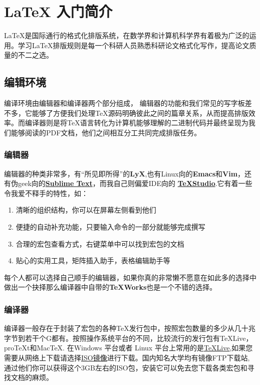 \section{LaTeX 入门简介}
\LaTeX 是国际通行的格式化排版系统，在数学界和计算机科学界有着极为广泛的运用。学习\LaTeX 排版规则是每一个科研人员熟悉科研论文格式化写作，提高论文质量的不二之选。
\subsection{编辑环境}
编译环境由编辑器和编译器两个部分组成， 编辑器的功能和我们常见的写字板差不多，它能够了方便我们处理\TeX 源码明确彼此之间的篇章关系，从而提高排版效率。而编译器则是将\TeX 语言转化为计算机能够理解的二进制代码并最终呈现为我们能够阅读的PDF文档，他们之间相互分工共同完成排版任务。
\subsubsection{编辑器}
编辑器的种类非常多，有“所见即所得”的\textbf{LyX},也有Linux向的\textbf{Emacs}和\textbf{Vim}，还有伪geek向的\href{http://www.sublimetext.com/}{\textbf{Sublime Text}}，而我自己则偏爱IDE向的
\href{http://texstudio.sourceforge.net/}{\textbf{\TeX Studio}}.它有着一些令我爱不释手的特性，如：
\begin{enumerate}
\item 清晰的组织结构，你可以在屏幕左侧看到他们
\item 便捷的自动补充功能，只要输入命令的一部分就能够完成撰写
\item 合理的宏包查看方式，右键菜单中可以找到宏包的文档
\item 贴心的实用工具，矩阵插入助手，表格编辑助手等
\end{enumerate}

每个人都可以选择自己顺手的编辑器，如果你真的非常懒不愿意在如此多的选择中做出一个抉择那么编译器中自带的\textbf{\TeX Works}也是一个不错的选择。
\subsubsection{编译器}
编译器一般存在于封装了宏包的各种\TeX 发行包中，按照宏包数量的多少从几十兆字节到若干个G都有。按照操作系统平台的不同，比较流行的发行包有\TeX Live，pro\TeX t和Mac\TeX . 在Windows 平台或者 Linux 平台上常用的是\href{https://www.tug.org/texlive/}{\TeX Live},如果您需要从网络上下载请选择\href{https://www.tug.org/texlive/acquire-iso.html}{ISO镜像}进行下载。国内知名大学均有镜像FTP下载站,通过他们你可以获得这个3GB左右的ISO包，安装它可以免去您下载各类宏包和寻找文档的麻烦。
